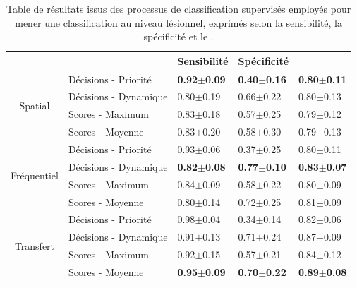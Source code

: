 \begin{table}[H]
    \centering
    \begin{tabular}{cllll}
        \toprule
        \multicolumn{1}{l}{}         &                              & Sensibilité           & Spécificité           & \fscore{}                         \\ \midrule
        \multirow{4}{*}{Spatial}     & Décisions - Priorité         & \textbf{0.92$\pm$0.09}    & \textbf{0.40$\pm$0.16}    & \textbf{0.80$\pm$0.11}    \\
                                     & Décisions - Dynamique        & 0.80$\pm$0.19             & 0.66$\pm$0.22             & 0.80$\pm$0.13             \\
                                     & Scores - Maximum             & 0.83$\pm$0.18             & 0.57$\pm$0.25             & 0.79$\pm$0.12             \\
                                     & Scores - Moyenne             & 0.83$\pm$0.20             & 0.58$\pm$0.30             & 0.79$\pm$0.13             \\ \midrule
        \multirow{4}{*}{Fréquentiel} & Décisions - Priorité         & 0.93$\pm$0.06             & 0.37$\pm$0.25             & 0.80$\pm$0.11             \\
                                     & Décisions - Dynamique        & \textbf{0.82$\pm$0.08}    & \textbf{0.77$\pm$0.10}    & \textbf{0.83$\pm$0.07}    \\
                                     & Scores - Maximum             & 0.84$\pm$0.09             & 0.58$\pm$0.22             & 0.80$\pm$0.09             \\
                                     & Scores - Moyenne             & 0.80$\pm$0.14             & 0.72$\pm$0.25             & 0.81$\pm$0.09             \\ \midrule
        \multirow{4}{*}{Transfert}   & Décisions - Priorité         & 0.98$\pm$0.04             & 0.34$\pm$0.14             & 0.82$\pm$0.06             \\
                                     & Décisions - Dynamique        & 0.91$\pm$0.13             & 0.71$\pm$0.24             & 0.87$\pm$0.09             \\
                                     & Scores - Maximum             & 0.92$\pm$0.15             & 0.57$\pm$0.21             & 0.84$\pm$0.12             \\
                                     & Scores - Moyenne             & \textbf{0.95$\pm$0.09}    & \textbf{0.70$\pm$0.22}    & \textbf{0.89$\pm$0.08}    \\ \bottomrule
    \end{tabular}
    \caption{Table de résultats issus des processus de classification supervisés employés pour mener une classification au niveau lésionnel, exprimés selon la sensibilité, la spécificité et le \fscore{}.}
    \label{tab:results_lesion_classification_supervised_patient}
\end{table}

